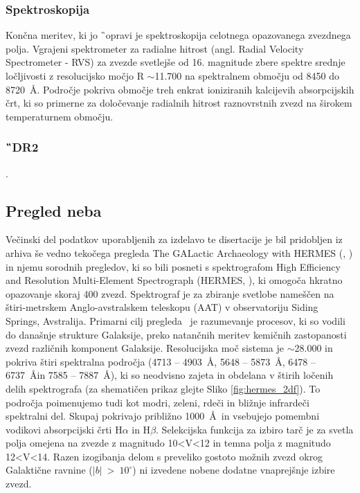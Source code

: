 \subsubsection{Spektroskopija}
Končna meritev, ki jo \G\ opravi je spektroskopija celotnega opazovanega zvezdnega polja. Vgrajeni spektrometer za radialne hitrost (angl. Radial Velocity Spectrometer - RVS) za zvezde svetlejše od 16. magnitude zbere spektre srednje ločljivosti z resolucijsko močjo R $\sim$11.700 na spektralnem območju od 8450 do 8720~\AA. Področje pokriva območje treh enkrat ioniziranih kalcijevih absorpcijskih črt, ki so primerne za določevanje radialnih hitrost raznovrstnih zvezd na širokem temperaturnem območju.

\subsubsection{\G\ DR2}
.

\subsection{Pregled neba \Gh}
\label{sec:slo_galah}
Večinski del podatkov uporabljenih za izdelavo te disertacije je bil pridobljen iz arhiva še vedno tekočega pregleda The GALactic Archaeology with HERMES (\Gh, \cite{2015MNRAS.449.2604D}) in njemu sorodnih pregledov, ki so bili posneti s spektrografom High Efficiency and Resolution Multi-Element Spectrograph (HERMES, \cite{2010SPIE.7735E..09B, 2015JATIS...1c5002S}), ki omogoča hkratno opazovanje skoraj 400 zvezd. Spektrograf je za zbiranje svetlobe nameščen na štiri-metrskem Anglo-avstralskem teleskopu (AAT) v observatoriju Siding Springs, Avstralija. Primarni cilj pregleda \Gh\ je razumevanje procesov, ki so vodili do današnje strukture Galaksije, preko natančnih meritev kemičnih zastopanosti zvezd različnih komponent Galaksije. Resolucijska moč sistema je $\sim$28.000 in pokriva štiri spektralna področja (4713 -- 4903~\AA, 5648 -- 5873~\AA, 6478 -- 6737~\AA in 7585 -- 7887~\AA), ki so neodvisno zajeta in obdelana v štirih ločenih delih spektrografa (za shematičen prikaz glejte Sliko \ref{fig:hermes_2df}). To področja poimenujemo tudi kot modri, zeleni, rdeči in bližnje infrardeči spektralni del. Skupaj pokrivajo približno 1000~\AA\ in vsebujejo pomembni vodikovi absorpcijski črti H$\alpha$ in H$\beta$. Selekcijska funkcija za izbiro tarč je za svetla polja omejena na zvezde z magnitudo 10<V<12 in temna polja z magnitudo 12<V<14. Razen izogibanja delom s preveliko gostoto možnih zvezd okrog Galaktične ravnine ($|b|$~>~$10^\circ$) ni izvedene nobene dodatne vnaprejšnje izbire zvezd.

